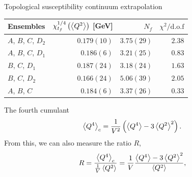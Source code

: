 \documentclass[10pt,show notes on second screen]{beamer}
\begin{document}
\begin{frame}{Topological susceptibility continuum extrapolation}
\begin{table}
    \centering
    \begin{tabular}{l r r r}
        \toprule
        Ensembles               & $\chi_{t_f}^{1/4}\left( \left\langle{Q^2}\right\rangle \right)$ [GeV]   & $N_f$         & $\chi^2/\mathrm{d.o.f}$ \\ \midrule
        $A$, $B$, $C$, $D_2$    & $0.179(10)$                                           & $3.75(29)$    & $2.38$ \\
        $A$, $B$, $C$, $D_1$    & $0.186(6)$                                            & $3.21(25)$    & $0.83$ \\
        $B$, $C$, $D_1$         & $0.187(24)$                                           & $3.18(24)$    & $1.63$ \\ 
        $B$, $C$, $D_2$         & $0.166(24)$                                           & $5.06(39)$    & $2.05$ \\ 
        $A$, $B$, $C$           & $0.184(6)$                                            & $3.37(26)$    & $0.33$ \\
        \bottomrule
    \end{tabular}
\end{table}
\end{frame}

\begin{frame}{The fourth cumulant}
\begin{align*}
    \left\langle{Q^4}\right\rangle_c = \frac{1}{V^2}\left(\left\langle{Q^4}\right\rangle - 3\left\langle{Q^2}\right\rangle^2\right).
\end{align*}
From this, we can also measure the ratio $R$,
\begin{align*}
    R = \frac{\left\langle{Q^4}\right\rangle_c}{\frac{1}{V}\left\langle{Q^2}\right\rangle} = \frac{1}{V}\frac{\left\langle{Q^4}\right\rangle - 3\left\langle{Q^2}\right\rangle^2}{\left\langle{Q^2}\right\rangle},
\end{align*}
\end{frame}
\end{document}
